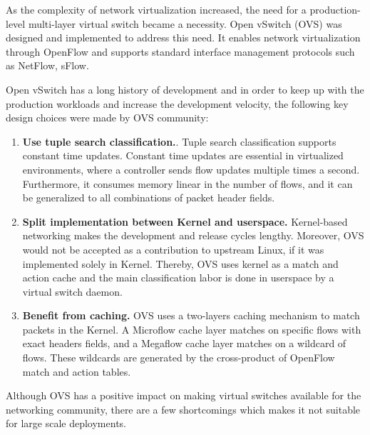 As the complexity of network virtualization increased, the need for a production-level 
multi-layer virtual switch became a necessity. Open vSwitch (OVS) was designed and implemented 
to address this need. It enables network virtualization through OpenFlow and supports standard 
interface management protocols such as NetFlow\cite{claise2004cisco}, sFlow\cite{wang2004sflow}.

Open vSwitch has a long history of development and in order to keep up with the production 
workloads and increase the development velocity, the following key design choices were made 
by OVS community:

\begin{enumerate}
    \item \textbf{Use tuple search classification.}.  Tuple search classification supports 
    constant time updates. Constant time updates are essential in virtualized environments,
    where a controller sends flow updates multiple times a second. Furthermore, it consumes 
    memory linear in the number of flows, and it can be generalized to all combinations of 
    packet header fields.

    \item \textbf{Split implementation between Kernel and userspace.} Kernel-based networking 
    makes the development and release cycles lengthy. Moreover, OVS would not be accepted as 
    a contribution to upstream Linux, if it was implemented solely in Kernel. Thereby, OVS 
    uses kernel as a match and action cache and the main classification labor is done in 
    userspace by a virtual switch daemon.

    \item \textbf{Benefit from caching.} OVS uses a two-layers caching mechanism to match 
    packets in the Kernel. A Microflow cache layer matches on specific flows with exact 
    headers fields, and a Megaflow cache layer matches on a wildcard of flows. These wildcards 
    are generated by the cross-product of OpenFlow match and action tables.
    
\end{enumerate}

Although OVS has a positive impact on making virtual switches available for the networking 
community, there are a few shortcomings which makes it not suitable for large scale 
deployments.

